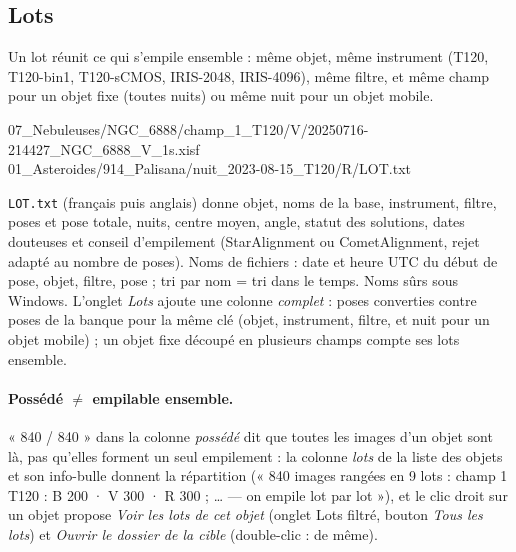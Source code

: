 \subsection{Lots}
Un lot réunit ce qui s'empile ensemble : même objet, même instrument (T120, T120-bin1, T120-sCMOS, IRIS-2048,
IRIS-4096), même filtre, et même champ pour un objet fixe (toutes nuits) ou même nuit pour un objet mobile.
\begin{ccode}
07\_Nebuleuses/NGC\_6888/champ\_1\_T120/V/20250716-214427\_NGC\_6888\_V\_1s.xisf\\
01\_Asteroides/914\_Palisana/nuit\_2023-08-15\_T120/R/LOT.txt
\end{ccode}
\texttt{LOT.txt} (français puis anglais) donne objet, noms de la base, instrument, filtre, poses et pose totale,
nuits, centre moyen, angle, statut des solutions, dates douteuses et conseil d'empilement (StarAlignment ou
CometAlignment, rejet adapté au nombre de poses). Noms de fichiers : date et heure UTC du début de pose, objet,
filtre, pose ; tri par nom = tri dans le temps. Noms sûrs sous Windows. L'onglet \emph{Lots} ajoute une colonne
\emph{complet} : poses converties contre poses de la banque pour la même clé (objet, instrument, filtre, et nuit
pour un objet mobile) ; un objet fixe découpé en plusieurs champs compte ses lots ensemble.

\paragraph{Possédé $\neq$ empilable ensemble.} « 840 / 840 » dans la colonne \emph{possédé} dit que toutes les
images d'un objet sont là, pas qu'elles forment un seul empilement : la colonne \emph{lots} de la liste des objets
et son info-bulle donnent la répartition (« 840 images rangées en 9 lots : champ 1 T120 : B 200 · V 300 · R 300 ;
… — on empile lot par lot »), et le clic droit sur un objet propose \emph{Voir les lots de cet objet} (onglet Lots
filtré, bouton \emph{Tous les lots}) et \emph{Ouvrir le dossier de la cible} (double-clic : de même).

